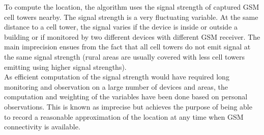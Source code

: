 To compute the location, the algorithm uses the signal strength of captured GSM cell towers nearby.
The signal strength is a very fluctuating variable.
At the same distance to a cell tower, the signal varies if the device is inside or outside a building or if monitored by two different devices with different GSM receiver.
The main imprecision ensues from the fact that all cell towers do not emit signal at the same signal strength (rural areas are usually covered with less cell towers emitting using higher signal strengths).\\

As efficient computation of the signal strength would have required long monitoring and observation on a large number of devices and areas, the computation and weighting of the variables have been done based on personal observations.
This is known as imprecise but achieves the purpose of being able to record a reasonable approximation of the location at any time when GSM connectivity is available.\\

